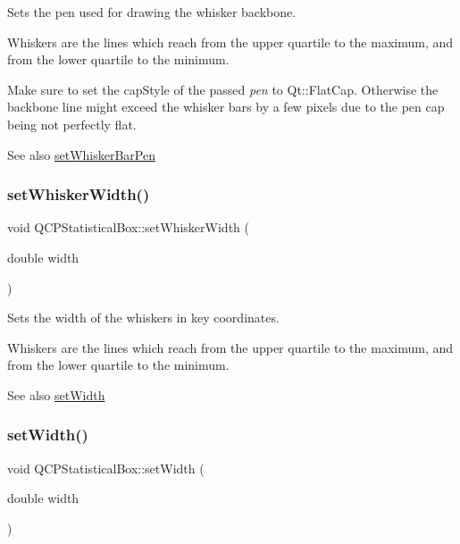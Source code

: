 Sets the pen used for drawing the whisker backbone.

Whiskers are the lines which reach from the upper quartile to the maximum, and from the lower quartile to the minimum.

Make sure to set the {\ttfamily cap\+Style} of the passed {\itshape pen} to {\ttfamily Qt\+::\+Flat\+Cap}. Otherwise the backbone line might exceed the whisker bars by a few pixels due to the pen cap being not perfectly flat.

\begin{DoxySeeAlso}{See also}
\hyperlink{class_q_c_p_statistical_box_aa8d3e503897788e1abf68dc74b5f147f}{set\+Whisker\+Bar\+Pen} 
\end{DoxySeeAlso}
\mbox{\label{class_q_c_p_statistical_box_adf378812446bd66f34d1f7f293d991cd}} 
\subsubsection{\texorpdfstring{set\+Whisker\+Width()}{setWhiskerWidth()}}
{\footnotesize\ttfamily void Q\+C\+P\+Statistical\+Box\+::set\+Whisker\+Width (\begin{DoxyParamCaption}\item[{double}]{width }\end{DoxyParamCaption})}

Sets the width of the whiskers in key coordinates.

Whiskers are the lines which reach from the upper quartile to the maximum, and from the lower quartile to the minimum.

\begin{DoxySeeAlso}{See also}
\hyperlink{class_q_c_p_statistical_box_a0b62775bd67301b1eba5c785f2b26f14}{set\+Width} 
\end{DoxySeeAlso}
\mbox{\label{class_q_c_p_statistical_box_a0b62775bd67301b1eba5c785f2b26f14}} 
\subsubsection{\texorpdfstring{set\+Width()}{setWidth()}}
{\footnotesize\ttfamily void Q\+C\+P\+Statistical\+Box\+::set\+Width (\begin{DoxyParamCaption}\item[{double}]{width }\end{DoxyParamCaption})}

